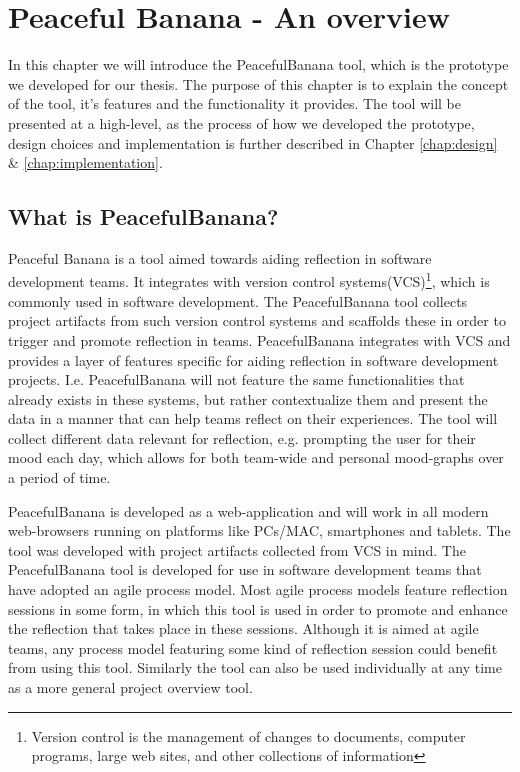 \chapter{Peaceful Banana - An overview}
\label{peacefulBananaApplication}
In this chapter we will introduce the PeacefulBanana tool, which is the prototype we developed for our thesis. The purpose of this chapter is to explain the concept of the tool, it's features and the functionality it provides. The tool will be presented at a high-level, as the process of how we developed the prototype, design choices and implementation is further described in Chapter \ref{chap:design} \& \ref{chap:implementation}.
\section{What is PeacefulBanana?}
Peaceful Banana is a tool aimed towards aiding reflection in software development teams. It integrates with version control systems(VCS)\footnote{Version control is the management of changes to documents, computer programs, large web sites, and other collections of information}, which is commonly used in software development. The PeacefulBanana tool collects project artifacts from such version control systems and scaffolds these in order to trigger and promote reflection in teams. PeacefulBanana integrates with VCS and provides a layer of features specific for aiding reflection in software development projects. I.e.  PeacefulBanana will not feature the same functionalities that already exists in these systems, but rather contextualize them and present the data in a manner that can help teams reflect on their experiences. The tool will collect different data relevant for reflection, e.g. prompting the user for their mood each day, which allows for both team-wide and personal mood-graphs over a period of time.

PeacefulBanana is developed as a web-application and will work in all modern web-browsers running on platforms like PCs/MAC, smartphones and tablets.
The tool was developed with project artifacts collected from VCS in mind. The PeacefulBanana tool is developed for use in software development teams that have adopted an agile process model. Most agile process models feature reflection sessions in some form, in which this tool is used in order to promote and enhance the reflection that takes place in these sessions. Although it is aimed at agile teams, any process model featuring some kind of reflection session could benefit from using this tool. Similarly the tool can also be used individually at any time as a more general project overview tool. 

